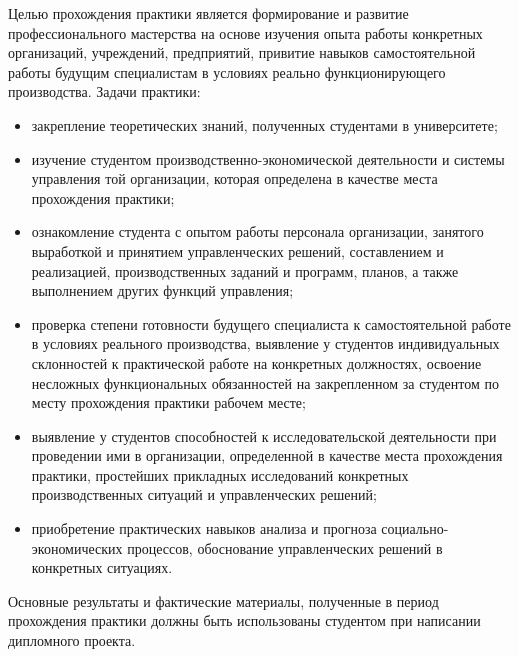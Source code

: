 
Целью прохождения практики является формирование и развитие профессионального мастерства на основе изучения опыта работы конкретных организаций, учреждений, предприятий, привитие навыков самостоятельной работы будущим специалистам в условиях реально функционирующего производства.
Задачи практики:

\begin{itemize}
\item закрепление теоретических знаний, полученных студентами в университете;
\item изучение студентом производственно-экономической деятельности и системы управления той организации, которая определена в качестве места прохождения практики;
\item ознакомление студента с опытом работы персонала организации, занятого выработкой и принятием управленческих решений, составлением и реализацией, производственных заданий и программ, планов, а также выполнением других функций управления;
\item проверка степени готовности будущего специалиста к самостоятельной работе в условиях реального производства, выявление у студентов индивидуальных склонностей к практической работе на конкретных должностях, освоение несложных функциональных обязанностей на закрепленном за студентом по месту прохождения практики рабочем месте;
\item выявление у студентов способностей к исследовательской деятельности при проведении ими в организации, определенной в качестве места прохождения практики, простейших прикладных исследований конкретных производственных ситуаций и управленческих решений;
\item приобретение практических навыков анализа и прогноза социально-экономических процессов, обоснование управленческих решений в конкретных ситуациях.
\end{itemize}

Основные результаты и фактические материалы, полученные в период прохождения практики должны быть использованы студентом при написании дипломного проекта.